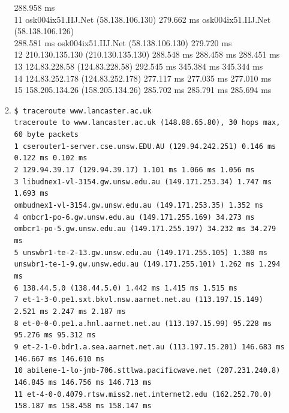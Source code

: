 \documentclass[a4paper,11pt]{article}
\newcommand{\code}{\texttt}
\begin{document}
\begin{enumerate}[leftmargin=*]
\begin{enumerate}
{			288.958 ms\\
			11  osk004ix51.IIJ.Net (58.138.106.130)  279.662 ms osk004ix51.IIJ.Net (58.138.106.126)\\
			288.581 ms osk004ix51.IIJ.Net (58.138.106.130)  279.720 ms\\
			12  210.130.135.130 (210.130.135.130)  288.548 ms  288.458 ms  288.451 ms\\
			13  124.83.228.58 (124.83.228.58)  292.545 ms  345.384 ms  345.344 ms\\
			14  124.83.252.178 (124.83.252.178)  277.117 ms  277.035 ms  277.010 ms\\
			15  158.205.134.26 (158.205.134.26)  285.702 ms  285.791 ms  285.694 ms\\}
		\item \code{\scriptsize \$ traceroute www.lancaster.ac.uk\\
			traceroute to www.lancaster.ac.uk (148.88.65.80), 30 hops max, 60 byte packets\\
			 1  cserouter1-server.cse.unsw.EDU.AU (129.94.242.251)  0.146 ms  0.122 ms  0.102 ms\\
			 2  129.94.39.17 (129.94.39.17)  1.101 ms  1.066 ms  1.056 ms\\
			 3  libudnex1-vl-3154.gw.unsw.edu.au (149.171.253.34)  1.747 ms  1.693 ms\\
			 ombudnex1-vl-3154.gw.unsw.edu.au (149.171.253.35)  1.352 ms\\
			 4  ombcr1-po-6.gw.unsw.edu.au (149.171.255.169)  34.273 ms\\
			 ombcr1-po-5.gw.unsw.edu.au (149.171.255.197)  34.232 ms  34.279 ms\\
			 5  unswbr1-te-2-13.gw.unsw.edu.au (149.171.255.105)  1.380 ms\\
			 unswbr1-te-1-9.gw.unsw.edu.au (149.171.255.101)  1.262 ms  1.294 ms\\
			 6  138.44.5.0 (138.44.5.0)  1.442 ms  1.415 ms  1.515 ms\\
			 7  et-1-3-0.pe1.sxt.bkvl.nsw.aarnet.net.au (113.197.15.149)  2.521 ms  2.247 ms  2.187 ms\\
			 8  et-0-0-0.pe1.a.hnl.aarnet.net.au (113.197.15.99)  95.228 ms  95.276 ms  95.312 ms\\
			 9  et-2-1-0.bdr1.a.sea.aarnet.net.au (113.197.15.201)  146.683 ms  146.667 ms  146.610 ms\\
			10  abilene-1-lo-jmb-706.sttlwa.pacificwave.net (207.231.240.8)  146.845 ms  146.756 ms  146.713 ms\\
			11  et-4-0-0.4079.rtsw.miss2.net.internet2.edu (162.252.70.0)  158.187 ms  158.458 ms  158.147 ms\\
}
\end{enumerate}
\end{enumerate}
\end{document}
